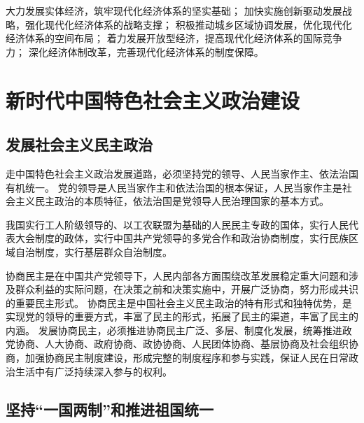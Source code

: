 \documentclass[a4paper, UTF8]{ctexart}
\begin{document}
    大力发展实体经济，筑牢现代化经济体系的坚实基础；
    加快实施创新驱动发展战略，强化现代化经济体系的战略支撑；
    积极推动城乡区域协调发展，优化现代化经济体系的空间布局；
    着力发展开放型经济，提高现代化经济体系的国际竞争力；
    深化经济体制改革，完善现代化经济体系的制度保障。

\section{新时代中国特色社会主义政治建设}
    \subsection{发展社会主义民主政治}
    走中国特色社会主义政治发展道路，必须坚持党的领导、人民当家作主、依法治国有机统一。
    党的领导是人民当家作主和依法治国的根本保证，人民当家作主是社会主义民主政治的本质特征，依法治国是党领导人民治理国家的基本方式。

    我国实行工人阶级领导的、以工农联盟为基础的人民民主专政的国体，实行人民代表大会制度的政体，实行中国共产党领导的多党合作和政治协商制度，实行民族区域自治制度，实行基层群众自治制度。

    协商民主是在中国共产党领导下，人民内部各方面围绕改革发展稳定重大问题和涉及群众利益的实际问题，在决策之前和决策实施中，开展广泛协商，努力形成共识的重要民主形式。
    协商民主是中国社会主义民主政治的特有形式和独特优势，是实现党的领导的重要方式，丰富了民主的形式，拓展了民主的渠道，丰富了民主的内涵。
    发展协商民主，必须推进协商民主广泛、多层、制度化发展，统筹推进政党协商、人大协商、政府协商、政协协商、人民团体协商、基层协商及社会组织协商，加强协商民主制度建设，形成完整的制度程序和参与实践，保证人民在日常政治生活中有广泛持续深入参与的权利。

    \subsection{坚持“一国两制”和推进祖国统一}
\end{document}
